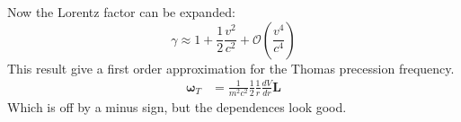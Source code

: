 \documentclass[12pt,a4]{article}
\begin{document}
\begin{enumerate}
\begin{enumerate}
        Now the Lorentz factor can be expanded:
        \begin{equation*}
          \gamma \approx 1 + \frac{1}{2} \frac{v^2}{c^2} + \mathcal{O}\left(\frac{v^4}{c^4}\right)
        \end{equation*}
        This result give a first order approximation for the Thomas precession frequency.
        \begin{align*}
          \boldsymbol{\omega}_T &= \frac{1}{m^2c^2}\frac{1}{2}\frac{1}{r}  \frac{d V}{dr} \mathbf{L} 
        \end{align*}
        Which is off by a minus sign, but the dependences look good.
    \end{enumerate}
\end{enumerate}
\end{document}
